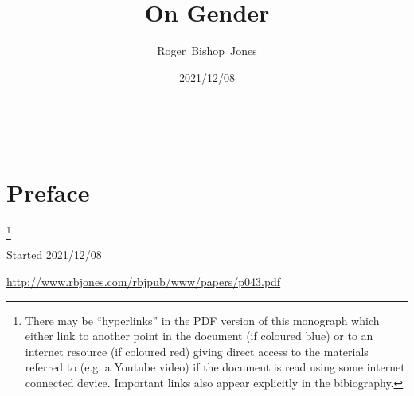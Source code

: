 \documentclass[10pt,titlepage]{article}
\title{\LARGE\bf On Gender}
\author{Roger~Bishop~Jones}
\date{\small 2021/12/08}
\newcommand{\ignore}[1]{}
\begin{document}
                               
\begin{titlepage}
\maketitle





\end{titlepage}

\ \

\ignore{
\begin{centering}
{}
\end{centering}
}%

\setcounter{tocdepth}{2}
{\parskip-0pt\tableofcontents}


\pagebreak

\section*{Preface}


\footnote{There may be ``hyperlinks'' in the PDF version of this monograph which either link to another point in the document  (if coloured blue) or to an internet resource  (if coloured red) giving direct access to the materials referred to (e.g. a Youtube video) if the document is read using some internet connected device.
Important links also appear explicitly in the bibiography.}


{}





\tiny{
Started 2021/12/08


\href{http://www.rbjones.com/rbjpub/www/papers/p043.pdf}{http://www.rbjones.com/rbjpub/www/papers/p043.pdf}

}%
\end{document}
